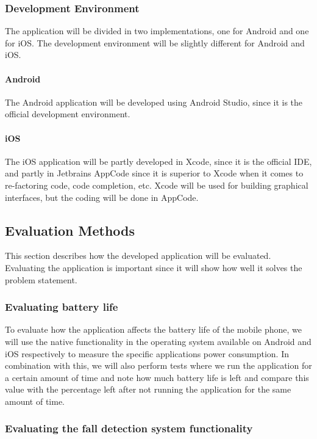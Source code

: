 \documentclass[12pt, a4paper, onecolumn]{article}
\begin{document}
	\subsubsection{Development Environment}
	
	The application will be divided in two implementations, one for Android and one for iOS. The development environment will be slightly different for Android and iOS. 
	
	\paragraph{Android}
	The Android application will be developed using Android Studio, since it is the official development environment.
	
	\paragraph{iOS}
	The iOS application will be partly developed in Xcode, since it is the official IDE, and partly in Jetbrains AppCode since it is superior to Xcode when it comes to re-factoring code, code completion, etc. Xcode will be used for building graphical interfaces, but the coding will be done in AppCode.
	
	\subsection{Evaluation Methods}
	
	This section describes how the developed application will be evaluated. Evaluating the application is important since it will show how well it solves the problem statement.
	
	\subsubsection{Evaluating battery life}
	
	To evaluate how the application affects the battery life of the mobile phone, we will use the native functionality in the operating system available on Android and iOS respectively to measure the specific applications power consumption.
	In combination with this, we will also perform tests where we run the application for a certain amount of time and note how much battery life is left and compare this value with the percentage left after not running the application for the same amount of time.
	
	\subsubsection{Evaluating the fall detection system functionality}
	
\end{document}
